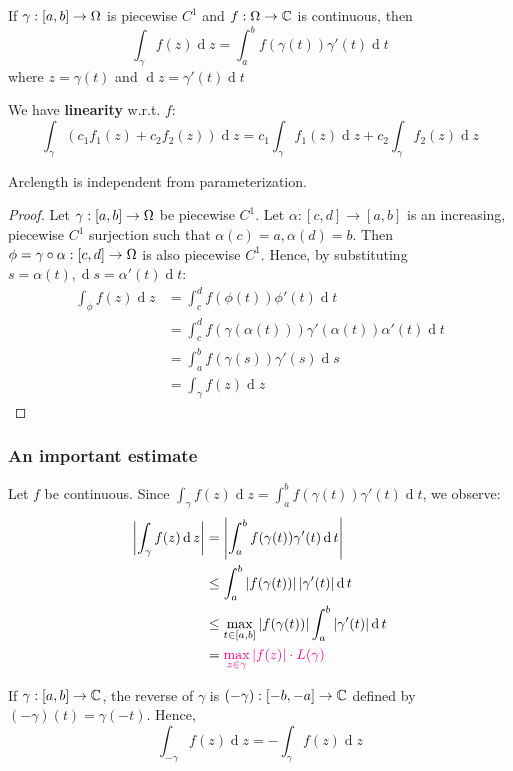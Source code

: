 \documentclass[12pt]{article}
\renewcommand{\d}{\ensuremath{\operatorname{d}}}
\begin{document}
 If $\gamma:[a,b]\to \Omega$ is piecewise $C^1$ and $f:\Omega \to\mathbb{C}$ is continuous, then \[\int_{\gamma}f(z)\d z=\int_{a}^{b}f(\gamma(t))\gamma'(t)\d t\]
where $z=\gamma(t)$ and $\d z=\gamma'(t)\d t$

We have \textbf{linearity} w.r.t. $f$: \[\int_{\gamma}\left( c_1f_1(z)+c_2f_2(z) \right)\d z=c_1\int_{\gamma}f_1(z)\d z+c_2\int_{\gamma}f_2(z)\d z\]

\rmk Arclength is independent from parameterization.
\begin{proof}
    Let $\gamma:[a,b]\to \Omega$ be piecewise $C^1$. Let $\alpha:[c,d] \to [a,b]$ is an increasing, piecewise $C^1$ surjection such that $\alpha(c)=a, \alpha(d)=b$. Then $\phi=\gamma\circ \alpha:[c,d]\to \Omega$ is also piecewise $C^1$. Hence, by substituting $s=\alpha(t), \d s=\alpha'(t)\d t$:
    \begin{align*}
        \int_{\phi}f(z)\d z&=\int_{c}^{d}f(\phi(t))\phi'(t)\d t\\
        &= \int_{c}^{d}f(\gamma(\alpha(t)))\gamma'(\alpha(t))\alpha'(t)\d t\\
        &= \int_{a}^{b}f(\gamma(s))\gamma'(s)\d s\\
        &= \int_{\gamma}f(z)\d z
    \end{align*}
\end{proof}

\subsubsection{An important estimate}
Let $f$ be continuous. Since \(\int_{\gamma}f(z)\d z=\int_{a}^{b}f(\gamma(t))\gamma'(t)\d t\), we observe: \begin{align*}
    \left|\int_{\gamma}f(z)\d z\right|&=\left|\int_{a}^{b}f(\gamma(t))\gamma'(t)\d t\right|\\
    &\leq \int_{a}^{b}|f(\gamma(t))|\,|\gamma'(t)|\d t\\
    &\leq \max_{t\in [a,b]}|f(\gamma(t))| \int_{a}^{b}|\gamma'(t)|\d t\\
    &= \rt{\max_{z\in \gamma}|f(z)|\cdot L(\gamma)}
\end{align*}


 If $\gamma:[a,b]\to\mathbb{C}$, the reverse of $\gamma$ is $(-\gamma):[-b,-a]\to\mathbb{C}$ defined by $(-\gamma)(t)=\gamma(-t)$.  Hence, \[\int_{-\gamma}f(z)\d z= -\int_{\gamma}f(z)\d z\]
\end{document}
